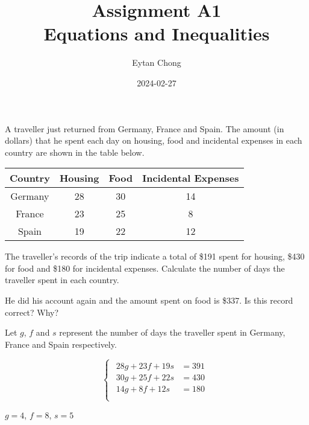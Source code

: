 \documentclass{echw}
\title{Assignment A1\\Equations and Inequalities}
\author{Eytan Chong}
\date{2024-02-27}
\begin{document}
    \problem{}
        A traveller just returned from Germany, France and Spain. The amount (in dollars) that he spent each day on housing, food and incidental expenses in each country are shown in the table below.

        \begin{table}[h]
            \centering
            \begin{tabular}{|c|c|c|c|}
            \hline
            \textbf{Country} & \textbf{Housing} & \textbf{Food} & \textbf{Incidental Expenses}  \\\hline
            Germany & 28      & 30   & 14                   \\\hline
            France  & 23      & 25   & 8                    \\\hline
            Spain   & 19      & 22   & 12 \\\hline                  
            \end{tabular}
        \end{table}

        The traveller's records of the trip indicate a total of \$191 spent for housing, \$430 for food and \$180 for incidental expenses. Calculate the number of days the traveller spent in each country.

        He did his account again and the amount spent on food is \$337. Is this record correct? Why?

    \solution
        Let $g$, $f$ and $s$ represent the number of days the traveller spent in Germany, France and Spain respectively. 

        \begin{equation*}
            \begin{cases}
                \begin{aligned}
                    28g + 23f + 19s &= 391\\
                    30g + 25f + 22s &= 430\\
                    14g + 8f + 12s &= 180\\
                \end{aligned}
            \end{cases}
        \end{equation*}

        \begin{center}
            $g=4$, $f=8$, $s=5$
        \end{center}

\end{document}
